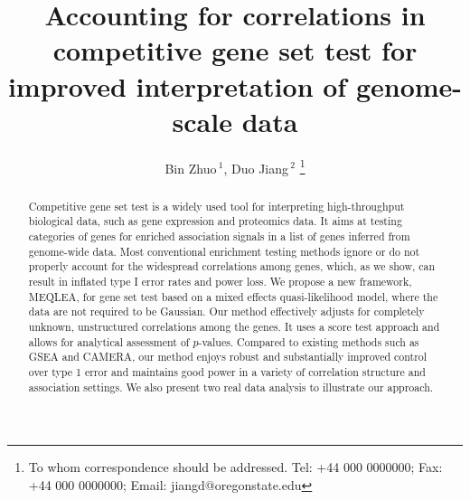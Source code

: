 \documentclass[a4,center,fleqn]{NAR}
\newcommand{\OurMethod}{MEQLEA}
\begin{document}
	
	
	\title{Accounting for correlations in competitive gene set
		test for improved interpretation of genome-scale data}
	
	\author{%
		Bin Zhuo\,$^{1}$,
		Duo Jiang\,$^{2}$
		\footnote{To whom correspondence should be addressed.
			Tel: +44 000 0000000; Fax: +44 000 0000000; Email: jiangd@oregonstate.edu}}
	
	\address{%
		$^{1, 2}$Department of Statistics, Oregon State University, 239 Weniger Hall, Corvallis, OR, 97333, USA}
	
	
	\maketitle
	
	
	
	
	
	
	
	\begin{abstract}
		Competitive gene set test is a widely used tool for interpreting high-throughput biological data,
		such as gene expression and proteomics data. It aims at testing categories of genes for enriched
		association signals in a list of genes inferred from genome-wide data. Most conventional enrichment
		testing methods ignore or do not properly account for the widespread correlations among genes,
		which, as we show, can result in inflated type I error rates and power loss. We propose a new
		framework, \OurMethod, for gene set test based on a mixed effects quasi-likelihood model, where the
		data are not required to be Gaussian. Our method effectively adjusts for completely unknown,
		unstructured correlations among the genes. It uses a score test approach and allows for analytical
		assessment of $p$-values. Compared to existing methods such as GSEA and CAMERA, our method enjoys
		robust and substantially improved control over type 1 error and maintains good power in a variety of
		correlation structure and association settings. We also present two real data analysis to illustrate
		our approach.
	\end{abstract}
	
\end{document}
